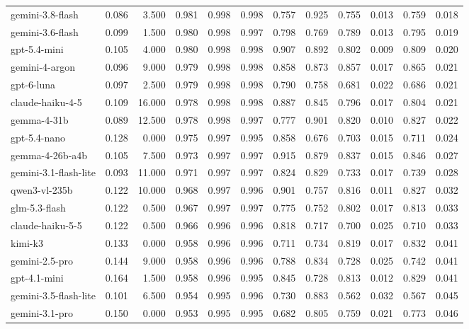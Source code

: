 \begin{table}
\begin{tabular}{lrrrrrrrrrrr}
gemini-3.8-flash & 0.086 & 3.500 & 0.981 & 0.998 & 0.998 & 0.757 & 0.925 & 0.755 & 0.013 & 0.759 & 0.018 \\
gemini-3.6-flash & 0.099 & 1.500 & 0.980 & 0.998 & 0.997 & 0.798 & 0.769 & 0.789 & 0.013 & 0.795 & 0.019 \\
gpt-5.4-mini & 0.105 & 4.000 & 0.980 & 0.998 & 0.998 & 0.907 & 0.892 & 0.802 & 0.009 & 0.809 & 0.020 \\
gemini-4-argon & 0.096 & 9.000 & 0.979 & 0.998 & 0.998 & 0.858 & 0.873 & 0.857 & 0.017 & 0.865 & 0.021 \\
gpt-6-luna & 0.097 & 2.500 & 0.979 & 0.998 & 0.998 & 0.790 & 0.758 & 0.681 & 0.022 & 0.686 & 0.021 \\
claude-haiku-4-5 & 0.109 & 16.000 & 0.978 & 0.998 & 0.998 & 0.887 & 0.845 & 0.796 & 0.017 & 0.804 & 0.021 \\
gemma-4-31b & 0.089 & 12.500 & 0.978 & 0.998 & 0.997 & 0.777 & 0.901 & 0.820 & 0.010 & 0.827 & 0.022 \\
gpt-5.4-nano & 0.128 & 0.000 & 0.975 & 0.997 & 0.995 & 0.858 & 0.676 & 0.703 & 0.015 & 0.711 & 0.024 \\
gemma-4-26b-a4b & 0.105 & 7.500 & 0.973 & 0.997 & 0.997 & 0.915 & 0.879 & 0.837 & 0.015 & 0.846 & 0.027 \\
gemini-3.1-flash-lite & 0.093 & 11.000 & 0.971 & 0.997 & 0.997 & 0.824 & 0.829 & 0.733 & 0.017 & 0.739 & 0.028 \\
qwen3-vl-235b & 0.122 & 10.000 & 0.968 & 0.997 & 0.996 & 0.901 & 0.757 & 0.816 & 0.011 & 0.827 & 0.032 \\
glm-5.3-flash & 0.122 & 0.500 & 0.967 & 0.997 & 0.997 & 0.775 & 0.752 & 0.802 & 0.017 & 0.813 & 0.033 \\
claude-haiku-5-5 & 0.122 & 0.500 & 0.966 & 0.996 & 0.996 & 0.818 & 0.717 & 0.700 & 0.025 & 0.710 & 0.033 \\
kimi-k3 & 0.133 & 0.000 & 0.958 & 0.996 & 0.996 & 0.711 & 0.734 & 0.819 & 0.017 & 0.832 & 0.041 \\
gemini-2.5-pro & 0.144 & 9.000 & 0.958 & 0.996 & 0.996 & 0.788 & 0.834 & 0.728 & 0.025 & 0.742 & 0.041 \\
gpt-4.1-mini & 0.164 & 1.500 & 0.958 & 0.996 & 0.995 & 0.845 & 0.728 & 0.813 & 0.012 & 0.829 & 0.041 \\
gemini-3.5-flash-lite & 0.101 & 6.500 & 0.954 & 0.995 & 0.996 & 0.730 & 0.883 & 0.562 & 0.032 & 0.567 & 0.045 \\
gemini-3.1-pro & 0.150 & 0.000 & 0.953 & 0.995 & 0.995 & 0.682 & 0.805 & 0.759 & 0.021 & 0.773 & 0.046 \\

\end{tabular}
\end{table}
